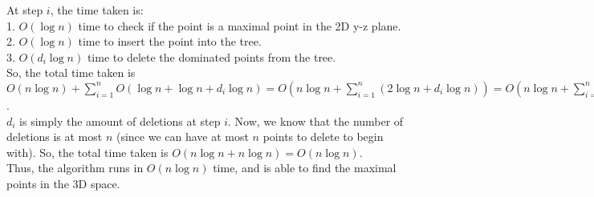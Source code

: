 \documentclass[a4paper]{article}
\begin{document}
\begin{enumerate}
    At step $i$, the time taken is:\\
    1. $O(\log n)$ time to check if the point is a maximal point in the 2D y-z plane.\\
    2. $O(\log n)$ time to insert the point into the tree.\\
    3. $O(d_i \log n)$ time to delete the dominated points from the tree.\\

    So, the total time taken is $O(n \log n) + \sum_{i=1}^{n} O(\log n + \log n + d_i \log n) = O(n \log n + \sum_{i=1}^{n} (2 \log n + d_i \log n)) = O(n \log n + \sum_{i=1}^{n} d_i \log n)$.\\

    $d_i$ is simply the amount of deletions at step $i$. Now, we know that the number of deletions is at most $n$ (since we can have at most $n$ points to delete to begin with). So, the total time taken is $O(n \log n + n \log n) = O(n \log n)$.\\

    Thus, the algorithm runs in $O(n \log n)$ time, and is able to find the maximal points in the 3D space.
    
    

\end{enumerate}
\end{document}
